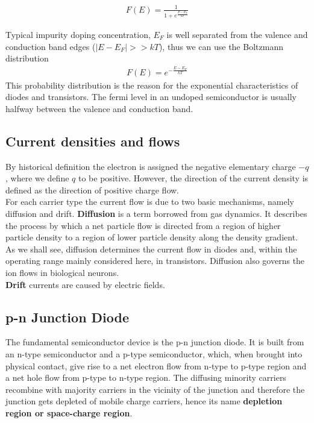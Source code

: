 \documentclass[main]{subfiles}
\begin{document}
\begin{align*}
F(E) = \frac{1}{1+e^{\frac{E-E_F}{kT}}}
\end{align*}

Typical impurity doping concentration, \(E_F\) is well separated from the valence and conduction band edges (\(|E-E_F| >> kT\)), thus we can use the Boltzmann distribution
\begin{align*}
F(E) = e^{-\frac{E-E_F}{kT}}
\end{align*}
This probability distribution is the reason for the exponential characteristics of diodes and transistors. The fermi level in an undoped semiconductor is usually halfway between the valence and conduction band.

\subsection{Current densities and flows}
By historical definition the electron is assigned the negative elementary charge \(-q\) , where we define \(q\) to be positive. However, the direction of the current density is defined as the direction of positive charge flow.\\ For each carrier type the current flow is due to two basic mechanisms, namely diffusion and drift.
\textbf{Diffusion} is a term borrowed from gas dynamics. It describes the process by which a net particle flow is directed from a region of higher particle density to a region of lower particle density along the density gradient. As we shall see, diffusion determines the current flow in diodes and, within the operating range mainly considered here, in transistors. Diffusion also governs the ion flows in biological neurons.\\
\textbf{Drift} currents are caused by electric fields.

\subsection{p-n Junction Diode}
The fundamental semiconductor device is the p-n junction diode. It is built from an n-type semiconductor and a p-type semiconductor, which, when brought into physical contact, give rise to a net electron flow from n-type to p-type region and a net hole flow from p-type to n-type region. The diffusing minority carriers recombine with majority carriers in the vicinity of the junction and therefore the junction gets depleted of mobile charge carriers, hence its name \textbf{depletion region or space-charge region}. 
\end{document}
